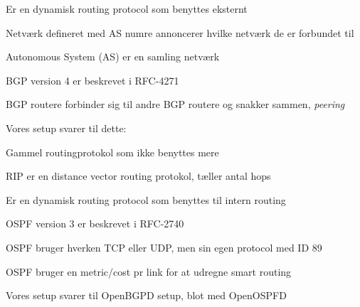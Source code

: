 \documentclass[Screen16to9,17pt]{foils}
\begin{document}
\begin{list1}
\item Er en dynamisk routing protocol som benyttes eksternt
\item Netværk defineret med AS numre annoncerer hvilke netværk de er forbundet til
\item Autonomous System (AS) er en samling netværk
\item BGP version 4 er beskrevet i RFC-4271
\item BGP routere forbinder sig til andre BGP routere og snakker sammen, \emph{peering}
\item {}
\item Vores setup svarer til dette:
\item {}
\end{list1}


\begin{list1}
\item Gammel routingprotokol som ikke benyttes mere
\item RIP er en distance vector routing protokol, tæller antal hops
\item {}
\end{list1}




\begin{list1}
\item Er en dynamisk routing protocol som benyttes til intern routing
\item OSPF version 3 er beskrevet i RFC-2740
\item OSPF bruger hverken TCP eller UDP, men sin egen protocol med ID 89
\item OSPF bruger en metric/cost pr link for at udregne smart routing
\item {}
\item Vores setup svarer til OpenBGPD setup, blot med OpenOSPFD
\end{list1}





\end{document}
